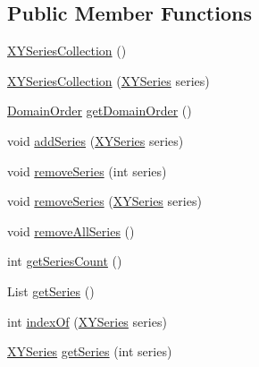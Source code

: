 \subsection*{Public Member Functions}
\begin{DoxyCompactItemize}
\item 
\mbox{\hyperlink{classorg_1_1jfree_1_1data_1_1xy_1_1_x_y_series_collection_a517f2d4c9dcf1d0ab91f65649636fde7}{X\+Y\+Series\+Collection}} ()
\item 
\mbox{\hyperlink{classorg_1_1jfree_1_1data_1_1xy_1_1_x_y_series_collection_abe0bf18087b3f686b0851fd693d33643}{X\+Y\+Series\+Collection}} (\mbox{\hyperlink{classorg_1_1jfree_1_1data_1_1xy_1_1_x_y_series}{X\+Y\+Series}} series)
\item 
\mbox{\hyperlink{classorg_1_1jfree_1_1data_1_1_domain_order}{Domain\+Order}} \mbox{\hyperlink{classorg_1_1jfree_1_1data_1_1xy_1_1_x_y_series_collection_a4b80b66e0dc0f3aa894d151cf0507711}{get\+Domain\+Order}} ()
\item 
void \mbox{\hyperlink{classorg_1_1jfree_1_1data_1_1xy_1_1_x_y_series_collection_ad13e68c0259c0db589cbfb7899b546aa}{add\+Series}} (\mbox{\hyperlink{classorg_1_1jfree_1_1data_1_1xy_1_1_x_y_series}{X\+Y\+Series}} series)
\item 
void \mbox{\hyperlink{classorg_1_1jfree_1_1data_1_1xy_1_1_x_y_series_collection_aa23250e0a18ae4f347c24848c0f97210}{remove\+Series}} (int series)
\item 
void \mbox{\hyperlink{classorg_1_1jfree_1_1data_1_1xy_1_1_x_y_series_collection_a3608eb7467ee118e7b73bae53b4e4fc3}{remove\+Series}} (\mbox{\hyperlink{classorg_1_1jfree_1_1data_1_1xy_1_1_x_y_series}{X\+Y\+Series}} series)
\item 
void \mbox{\hyperlink{classorg_1_1jfree_1_1data_1_1xy_1_1_x_y_series_collection_a7ed12fb0bda86b5d75d21eacc832d9cf}{remove\+All\+Series}} ()
\item 
int \mbox{\hyperlink{classorg_1_1jfree_1_1data_1_1xy_1_1_x_y_series_collection_ab50b1e302d11ddf25ef86dba1b2d4ffe}{get\+Series\+Count}} ()
\item 
List \mbox{\hyperlink{classorg_1_1jfree_1_1data_1_1xy_1_1_x_y_series_collection_a6eef615b55544cd6279f471777bce8a6}{get\+Series}} ()
\item 
int \mbox{\hyperlink{classorg_1_1jfree_1_1data_1_1xy_1_1_x_y_series_collection_adad1201352cade6c956ab905e09fec32}{index\+Of}} (\mbox{\hyperlink{classorg_1_1jfree_1_1data_1_1xy_1_1_x_y_series}{X\+Y\+Series}} series)
\item 
\mbox{\hyperlink{classorg_1_1jfree_1_1data_1_1xy_1_1_x_y_series}{X\+Y\+Series}} \mbox{\hyperlink{classorg_1_1jfree_1_1data_1_1xy_1_1_x_y_series_collection_a8d33eed9171abfd5a8cd125540c6f0d3}{get\+Series}} (int series)

\end{DoxyCompactItemize}
